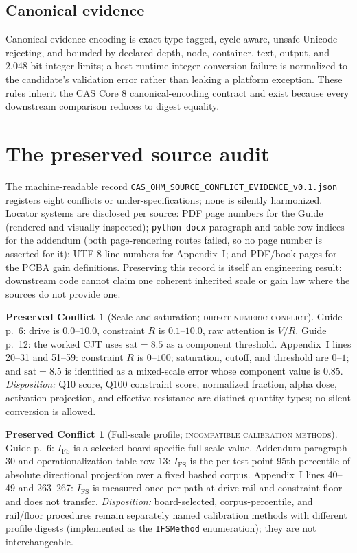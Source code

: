 \documentclass[11pt]{amsart}
\theoremstyle{definition}
\newtheorem{conflict}[theorem]{Preserved Conflict}
\theoremstyle{remark}
\begin{document}
\subsection{Canonical evidence}
Canonical evidence encoding is exact-type tagged, cycle-aware, unsafe-Unicode rejecting, and bounded by declared depth, node, container, text, output, and 2{,}048-bit integer limits; a host-runtime integer-conversion failure is normalized to the candidate's validation error rather than leaking a platform exception. These rules inherit the CAS Core 8 canonical-encoding contract and exist because every downstream comparison reduces to digest equality.

\section{The preserved source audit}\label{sec:audit}

The machine-readable record \texttt{CAS\_OHM\_SOURCE\_CONFLICT\_EVIDENCE\_v0.1.json} registers eight conflicts or under-specifications; none is silently harmonized. Locator systems are disclosed per source: PDF page numbers for the Guide (rendered and visually inspected); \texttt{python-docx} paragraph and table-row indices for the addendum (both page-rendering routes failed, so no page number is asserted for it); UTF-8 line numbers for Appendix~I; and PDF/book pages for the PCBA gain definitions. Preserving this record is itself an engineering result: downstream code cannot claim one coherent inherited scale or gain law where the sources do not provide one.

\begin{conflict}[Scale and saturation; \textnormal{\textsc{direct numeric conflict}}]\label{conf:scale}
Guide p.~6: drive is $0.0$--$10.0$, constraint $R$ is $0.1$--$10.0$, raw attention is $V/R$. Guide p.~12: the worked CJT uses $\mathrm{sat}=8.5$ as a component threshold. Appendix~I lines 20--31 and 51--59: constraint $R$ is $0$--$100$; saturation, cutoff, and threshold are $0$--$1$; and $\mathrm{sat}=8.5$ is identified as a mixed-scale error whose component value is $0.85$. \emph{Disposition:} Q10 score, Q100 constraint score, normalized fraction, alpha dose, activation projection, and effective resistance are distinct quantity types; no silent conversion is allowed.
\end{conflict}

\begin{conflict}[Full-scale profile; \textnormal{\textsc{incompatible calibration methods}}]\label{conf:ifs}
Guide p.~6: $I_{\mathrm{FS}}$ is a selected board-specific full-scale value. Addendum paragraph 30 and operationalization table row 13: $I_{\mathrm{FS}}$ is the per-test-point 95th percentile of absolute directional projection over a fixed hashed corpus. Appendix~I lines 40--49 and 263--267: $I_{\mathrm{FS}}$ is measured once per path at drive rail and constraint floor and does not transfer. \emph{Disposition:} board-selected, corpus-percentile, and rail/floor procedures remain separately named calibration methods with different profile digests (implemented as the \texttt{IFSMethod} enumeration); they are not interchangeable.
\end{conflict}
\end{document}
